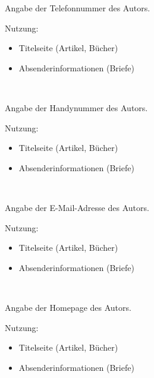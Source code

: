 \DescribeMacro{\telefon}
Angabe der Telefonnummer des Autors.

Nutzung:
\begin{itemize}
	\item Titelseite (Artikel, Bücher)
	\item Absenderinformationen (Briefe)
\end{itemize}

\begin{nutzung}
		\>\\
	\beispiel
		\>
\end{nutzung}

\DescribeMacro{\handy}
Angabe der Handynummer des Autors.

Nutzung:
\begin{itemize}
	\item Titelseite (Artikel, Bücher)
	\item Absenderinformationen (Briefe)
\end{itemize}

\begin{nutzung}
		\>\\
	\beispiel
		\>
\end{nutzung}

\DescribeMacro{\email}
Angabe der E-Mail-Adresse des Autors.

Nutzung:
\begin{itemize}
	\item Titelseite (Artikel, Bücher)
	\item Absenderinformationen (Briefe)
\end{itemize}

\begin{nutzung}
		\>\\
	\beispiel
		\>
\end{nutzung}

\DescribeMacro{\homepage}
Angabe der Homepage des Autors.

Nutzung:
\begin{itemize}
	\item Titelseite (Artikel, Bücher)
	\item Absenderinformationen (Briefe)
\end{itemize}

\begin{nutzung}
		\>\\
	\beispiel
		\>
\end{nutzung}

